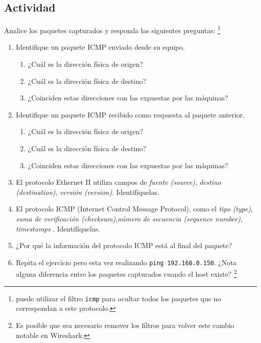 \documentclass[11pt]{utalcaDoc}
\begin{document}
\subsection{Actividad}
Analice los paquetes capturados y responda las siguientes preguntas: 
\footnote{puede utilizar el filtro \texttt{icmp} para ocultar todos los 
paquetes que no correspondan a este protocolo.}
\begin{enumerate}
    \item{ Identifique un paquete ICMP enviado desde su equipo. 
        \begin{enumerate}
            \item { ¿Cuál es la dirección física de origen?}
            \item { ¿Cuál es la dirección física de destino?}
            \item { ¿Coinciden estas direcciones con las expuestas por las máquinas?}
        \end{enumerate}
    }
    \item{ Identifique un paquete ICMP recibido como respuesta al paquete anterior. 
        \begin{enumerate}
            \item { ¿Cuál es la dirección física de origen?}
            \item { ¿Cuál es la dirección física de destino?}
            \item { ¿Coinciden estas direcciones con las expuestas por las máquinas?}
        \end{enumerate}
    }
    \item{ El protocolo Ethernet II utiliza campos de \emph{fuente (source)}, 
    \emph{destino (destination)}, \emph{versión (version)}. Identifíquelas.} 

    \item{ El protocolo ICMP (Internet Control Message Protocol), como el \emph{tipo (type)},
    \emph{suma de verificación (checksum)},\emph{número de secuencia (sequence number)},
    \emph{timestamps} }. Identifíquelas.

    \item {¿Por qué la información del protocolo ICMP está al final del paquete?}

    \item {Repita el ejercicio pero esta vez realizando \texttt{ping 192.168.0.150}.
    ¿Nota alguna diferencia entre los paquetes capturados cuando el host existe? 
    \footnote{Es posible que sea necesario
    remover los filtros para volver este cambio notable en Wireshark.}}
\end{enumerate}
\end{document}
